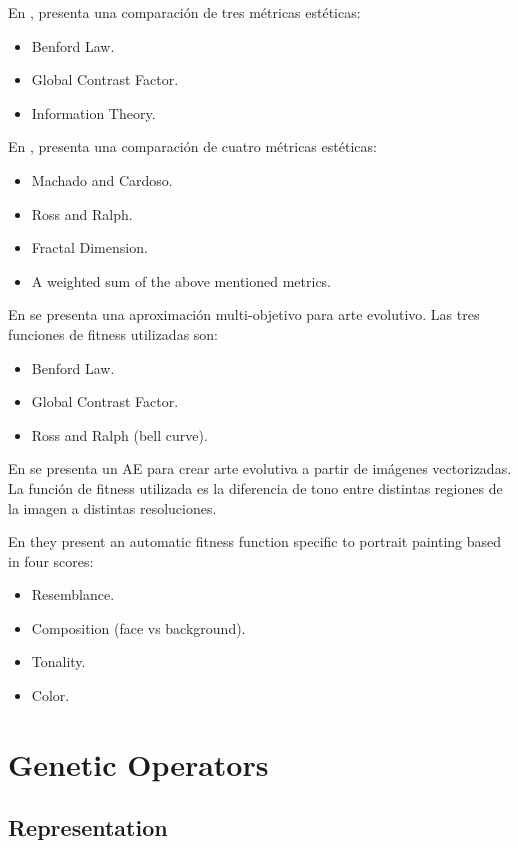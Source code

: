 \documentclass{llncs}
\begin{document}
En \cite{den2010using}, presenta una comparación de tres métricas estéticas:
\begin{itemize}
	\item Benford Law.
	\item Global Contrast Factor.
	\item Information Theory.
\end{itemize}

En \cite{den2010comparing}, presenta una comparación de cuatro métricas estéticas:
\begin{itemize}
	\item Machado and Cardoso.
	\item Ross and Ralph.
	\item Fractal Dimension.
	\item A weighted sum of the above mentioned metrics.
\end{itemize}

En \cite{den2011evolving} se presenta una aproximación multi-objetivo para arte evolutivo. Las tres funciones de fitness utilizadas son:
\begin{itemize}
	\item Benford Law.
	\item Global Contrast Factor.
	\item Ross and Ralph (bell curve).
\end{itemize}

En \cite{den2012evolving} se presenta un AE para crear arte evolutiva a partir de imágenes vectorizadas. La función de fitness utilizada es la diferencia de tono entre  distintas regiones de la imagen a distintas resoluciones.

En \cite{dipaola2009incorporating} they present an automatic fitness function specific to portrait painting based in four scores:
\begin{itemize}
	\item Resemblance.
	\item Composition (face vs background).
	\item Tonality.
	\item Color.
\end{itemize}


\section{Genetic Operators}\label{go}
\subsection{Representation}\label{go:repre}
\end{document}
